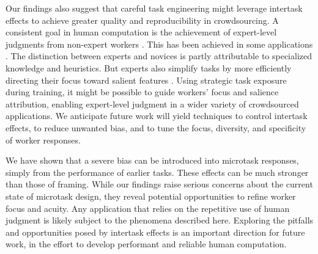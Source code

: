 \documentclass{sigchi}
\begin{document}
Our findings also suggest that careful task engineering might leverage
intertask effects to achieve greater quality and reproducibility in 
crowdsourcing.
A consistent goal in human computation is the achievement of expert-level
judgments from non-expert workers \cite{kittur2011crowdforge}.  
This has been achieved in some
applications \cite{snow2008cheap,Mortensen20131020,Warby2014385}. 
The distinction between experts and novices is partly attributable
to specialized knowledge and heuristics. 
But experts also simplify tasks by more efficiently directing 
their focus toward salient features \cite{kellman2009perceptual}.  
Using strategic task exposure during training, 
it might be possible to guide workers' focus 
and salience attribution, enabling expert-level 
judgment in a wider variety of
crowdsourced applications.
We anticipate future work will yield techniques to control intertask 
effects, to reduce unwanted bias, and to tune the focus, diversity, and 
specificity of worker responses.

We have shown that a severe bias can be introduced into microtask 
responses, simply from the performance of earlier tasks. 
These effects can be much stronger than those of framing.  
While our findings raise serious concerns about the 
current state of microtask design, they reveal potential opportunities 
to refine worker focus and acuity.  Any application that relies
on the repetitive use of human judgment is likely subject to the phenomena
described here.  Exploring the pitfalls and opportunities posed by
intertask effects is an important direction for future work, 
in the effort to develop performant and reliable human computation.



\end{document}
